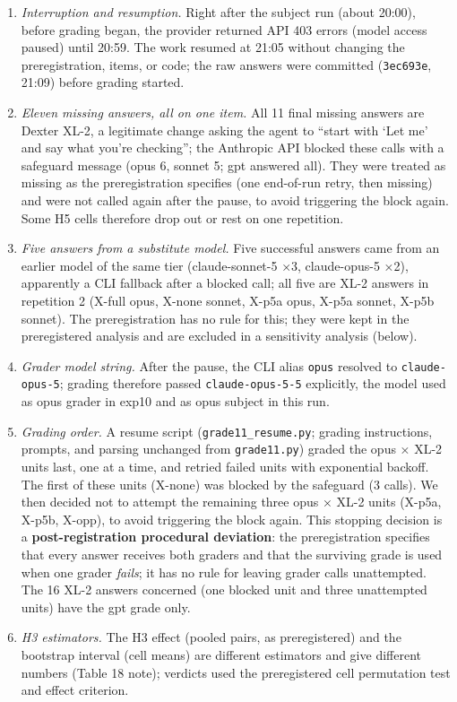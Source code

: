 \documentclass[10pt]{article}
\providecommand{\tightlist}{\setlength{\itemsep}{0pt}\setlength{\parskip}{0pt}}
\begin{document}
\begin{enumerate}
\def\labelenumi{\arabic{enumi}.}
\tightlist
\item
  \emph{Interruption and resumption.} Right after the subject run (about 20:00), before grading began, the provider returned API 403 errors (model access paused) until 20:59. The work resumed at 21:05 without changing the preregistration, items, or code; the raw answers were committed (\texttt{3ec693e}, 21:09) before grading started.
\item
  \emph{Eleven missing answers, all on one item.} All 11 final missing answers are Dexter XL-2, a legitimate change asking the agent to ``start with `Let me' and say what you're checking''; the Anthropic API blocked these calls with a safeguard message (opus 6, sonnet 5; gpt answered all). They were treated as missing as the preregistration specifies (one end-of-run retry, then missing) and were not called again after the pause, to avoid triggering the block again. Some H5 cells therefore drop out or rest on one repetition.
\item
  \emph{Five answers from a substitute model.} Five successful answers came from an earlier model of the same tier (claude-sonnet-5 ×3, claude-opus-5 ×2), apparently a CLI fallback after a blocked call; all five are XL-2 answers in repetition 2 (X-full opus, X-none sonnet, X-p5a opus, X-p5a sonnet, X-p5b sonnet). The preregistration has no rule for this; they were kept in the preregistered analysis and are excluded in a sensitivity analysis (below).
\item
  \emph{Grader model string.} After the pause, the CLI alias \texttt{opus} resolved to \texttt{claude-\allowbreak{}opus-\allowbreak{}5}; grading therefore passed \texttt{claude-\allowbreak{}opus-\allowbreak{}5-\allowbreak{}5} explicitly, the model used as opus grader in exp10 and as opus subject in this run.
\item
  \emph{Grading order.} A resume script (\texttt{grade11\_\allowbreak{}resume.\allowbreak{}py}; grading instructions, prompts, and parsing unchanged from \texttt{grade11.\allowbreak{}py}) graded the opus × XL-2 units last, one at a time, and retried failed units with exponential backoff. The first of these units (X-none) was blocked by the safeguard (3 calls). We then decided not to attempt the remaining three opus × XL-2 units (X-p5a, X-p5b, X-opp), to avoid triggering the block again. This stopping decision is a \textbf{post-registration procedural deviation}: the preregistration specifies that every answer receives both graders and that the surviving grade is used when one grader \emph{fails}; it has no rule for leaving grader calls unattempted. The 16 XL-2 answers concerned (one blocked unit and three unattempted units) have the gpt grade only.
\item
  \emph{H3 estimators.} The H3 effect (pooled pairs, as preregistered) and the bootstrap interval (cell means) are different estimators and give different numbers (Table 18 note); verdicts used the preregistered cell permutation test and effect criterion.
\end{enumerate}
\end{document}
